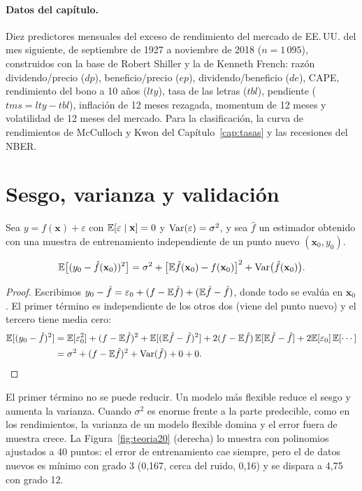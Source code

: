 \paragraph{Datos del capítulo.} Diez predictores mensuales del exceso de rendimiento del mercado de EE.\,UU. del mes
siguiente, de septiembre de 1927 a noviembre de 2018 ($n=1\,095$), construidos con la base de Robert Shiller y la de
Kenneth French: razón dividendo/precio ($dp$), beneficio/precio ($ep$), dividendo/beneficio ($de$), CAPE, rendimiento del
bono a 10 años ($lty$), tasa de las letras ($tbl$), pendiente ($tms=lty-tbl$), inflación de 12 meses rezagada, momentum de 12
meses y volatilidad de 12 meses del mercado. Para la clasificación, la curva de rendimientos de McCulloch y Kwon del
Capítulo~\ref{cap:tasas} y las recesiones del NBER.

\section{Sesgo, varianza y validación}

Sea $y=f(\mathbf x)+\varepsilon$ con $\mathbb{E}[\varepsilon\mid\mathbf x]=0$ y $\operatorname{Var}(\varepsilon)=\sigma^2$, y sea $\hat f$ un estimador obtenido con una
muestra de entrenamiento independiente de un punto nuevo $(\mathbf x_0,y_0)$.

\begin{proposicion}\label{prop:sesgovarianza}
\[
  \mathbb{E}\bigl[(y_0-\hat f(\mathbf x_0))^2\bigr]=\sigma^2+\bigl[\mathbb{E}\hat f(\mathbf x_0)-f(\mathbf x_0)\bigr]^2+\operatorname{Var}\bigl(\hat f(\mathbf x_0)\bigr).
\]
\end{proposicion}

\begin{proof}
Escribimos $y_0-\hat f=\varepsilon_0+(f-\mathbb{E}\hat f)+(\mathbb{E}\hat f-\hat f)$, donde todo se evalúa en $\mathbf x_0$. El primer término es
independiente de los otros dos (viene del punto nuevo) y el tercero tiene media cero:
\begin{align*}
  \mathbb{E}[(y_0-\hat f)^2] &= \mathbb{E}[\varepsilon_0^2]+(f-\mathbb{E}\hat f)^2+\mathbb{E}[(\mathbb{E}\hat f-\hat f)^2]+2(f-\mathbb{E}\hat f)\,\mathbb{E}[\mathbb{E}\hat f-\hat f]+2\mathbb{E}[\varepsilon_0]\,\mathbb{E}[\cdots]\\
                     &= \sigma^2+(f-\mathbb{E}\hat f)^2+\operatorname{Var}(\hat f)+0+0 .
\end{align*}
\end{proof}

El primer término no se puede reducir. Un modelo más flexible reduce el sesgo y aumenta la varianza. Cuando $\sigma^2$ es
enorme frente a la parte predecible, como en los rendimientos, la varianza de un modelo flexible domina y el error fuera de
muestra crece. La Figura~\ref{fig:teoria20} (derecha) lo muestra con polinomios ajustados a 40 puntos: el error de
entrenamiento cae siempre, pero el de datos nuevos es mínimo con grado 3 (0,167, cerca del ruido, 0,16) y se dispara a 4,75 con
grado 12.

